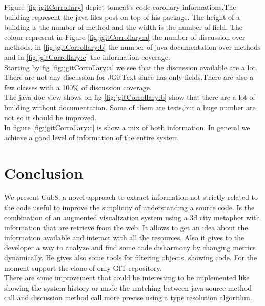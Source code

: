 \documentclass[]{usiinfbachelorproject}
\begin{document}
Figure \ref{fig:jgitCorrollary} depict tomcat's code corollary  informations.The building represent the java files post on top of his package. The height of a building is the number of method and the width is the number of field. The colour represent in Figure \ref{fig:jgitCorrollary:a} the number of discussion over methods, in \ref{fig:jgitCorrollary:b} the number of java documentation over methods and  in \ref{fig:jgitCorrollary:c} the information coverage.\\
Starting by fig \ref{fig:jgitCorrollary:a} we see that the discussion available are a lot. There are not any discussion for JGitText since has only fields.There are also a few classes with a 100\% of discussion coverage.\\
The java doc view shows on fig \ref{fig:jgitCorrollary:b} show that there are a lot of building without documentation. Some of them are tests,but a huge number are not so it should be improved.\\

In figure  \ref{fig:jgitCorrollary:c} is show a mix of both information. In general we achieve a good level of information of the entire system.  

\newpage
\section{Conclusion} \label{conclusion}
We present Cub8, a novel approach to extract information not strictly related to the code useful to improve the simplicity of understanding a source code. Is the combination of an augmented visualization system using a 3d city metaphor with information that are retrieve from the web. It allows to get  an idea about the information available and interact with all the resources. Also it gives to the developer a way to analyze and find some code disharmony by changing metrics dynamically. He gives also some tools for filtering objects, showing code. For the moment support the clone of only GIT repository. \\
There are some improvement that could be interesting to be implemented like showing the system history or made the matching between java source method call and discussion method call more precise using a type resolution algorithm.\\
  
  



\end{document}
